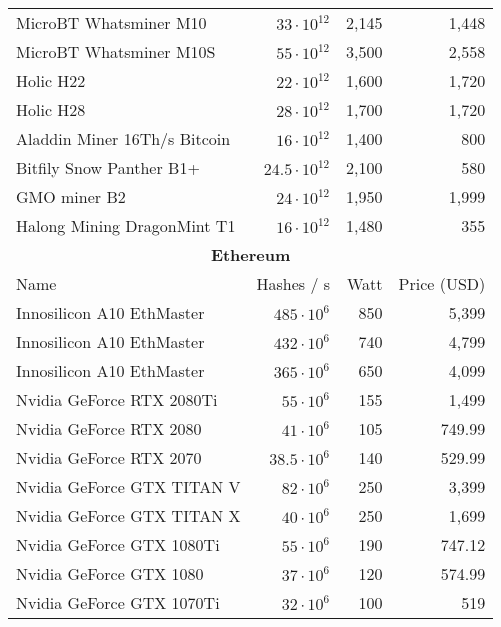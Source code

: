 \begin{longtable}{|p{}|r|r|r|}
  MicroBT Whatsminer M10 &       $33 \cdot 10^{12}$ & 2,145 & 1,448 \\
  MicroBT Whatsminer M10S &      $55 \cdot 10^{12}$ & 3,500 & 2,558 \\
  Holic H22 &                    $22 \cdot 10^{12}$ & 1,600 & 1,720 \\
  Holic H28 &                    $28 \cdot 10^{12}$ & 1,700 & 1,720 \\
  Aladdin Miner 16Th/s Bitcoin & $16 \cdot 10^{12}$ & 1,400 & 800 \\
  Bitfily Snow Panther B1+ &     $24.5 \cdot 10^{12}$ & 2,100 & 580 \\
  GMO miner B2 &                 $24 \cdot 10^{12}$ & 1,950 & 1,999 \\
  Halong Mining DragonMint T1 &  $16 \cdot 10^{12}$ & 1,480 & 355 \\
  \hline
  \multicolumn{4}{|c|}{\textbf{Ethereum}} \\
  \hline
  Name & Hashes / s & Watt & Price (USD)\\
  \hhline{|=|=|=|=|}
  Innosilicon A10 EthMaster                                           & $485 \cdot 10^6$ & 850 & 5,399 \\
  Innosilicon A10 EthMaster                                           & $432 \cdot 10^6$ & 740 & 4,799 \\
  Innosilicon A10 EthMaster                                           & $365 \cdot 10^6$ & 650 & 4,099 \\
  Nvidia GeForce RTX 2080Ti                                           & $ 55 \cdot 10^6$ & 155 & 1,499 \\
  Nvidia GeForce RTX 2080                                             & $ 41 \cdot 10^6$ & 105 & 749.99 \\
  Nvidia GeForce RTX 2070                                             & $ 38.5 \cdot 10^6$ & 140 & 529.99 \\
  Nvidia GeForce GTX TITAN V                                          & $ 82 \cdot 10^6$ & 250 & 3,399 \\
  Nvidia GeForce GTX TITAN X                                          & $ 40 \cdot 10^6$ & 250 & 1,699 \\
  Nvidia GeForce GTX 1080Ti                                           & $ 55 \cdot 10^6$ & 190 & 747.12 \\
  Nvidia GeForce GTX 1080                                             & $ 37 \cdot 10^6$ & 120 & 574.99 \\
  Nvidia GeForce GTX 1070Ti                                           & $ 32 \cdot 10^6$ & 100 & 519 \\

\end{longtable}
